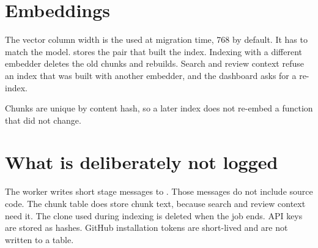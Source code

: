 \section{Embeddings}

The vector column width is the  used at migration time, 768 by default. It has to match the model.  stores the  pair that built the index. Indexing with a different embedder deletes the old chunks and rebuilds. Search and review context refuse an index that was built with another embedder, and the dashboard asks for a re-index.

Chunks are unique by content hash, so a later index does not re-embed a function that did not change.

\section{What is deliberately not logged}

The worker writes short stage messages to . Those messages do not include source code. The chunk table does store chunk text, because search and review context need it. The clone used during indexing is deleted when the job ends. API keys are stored as hashes. GitHub installation tokens are short-lived and are not written to a table.

